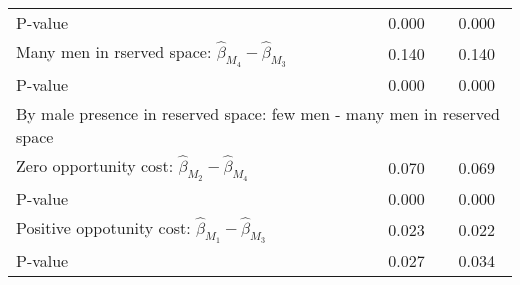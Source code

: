 \begin{tabular}{l*{2}{c}}
\quad P-value       &       0.000         &       0.000         \\
\quad Many men in rserved space: $\hat\beta_{M_4} - \hat\beta_{M_3}$ &       0.140         &       0.140         \\
\quad P-value       &       0.000         &       0.000         \\
\multicolumn{3}{l}{By male presence in reserved space: few men - many men in reserved space} \\ \quad Zero opportunity cost: $\hat\beta_{M_2} - \hat\beta_{M_4}$&       0.070         &       0.069         \\
\quad P-value       &       0.000         &       0.000         \\
\quad Positive oppotunity cost: $\hat\beta_{M_1} - \hat\beta_{M_3}$ &       0.023         &       0.022         \\
\quad P-value       &       0.027         &       0.034         \\
\hline\hline \end{tabular}
